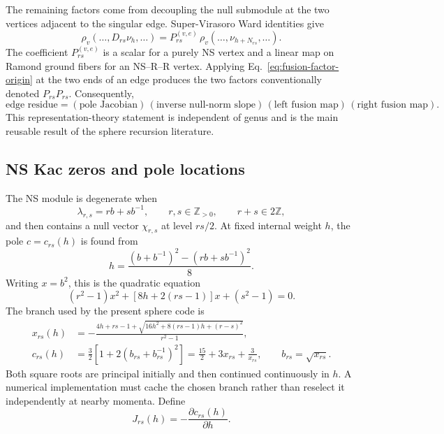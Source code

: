\documentclass[11pt]{article}
\begin{document}
The remaining factors come from decoupling the null submodule at the two
vertices adjacent to the singular edge.  Super-Virasoro Ward identities give
\begin{equation}
 \rho_v(\ldots,D_{rs}\nu_h,\ldots)
 =P^{(v,e)}_{rs}\,
  \rho_v(\ldots,\nu_{h+N_{rs}},\ldots).
 \label{eq:fusion-factor-origin}
\end{equation}
The coefficient $P^{(v,e)}_{rs}$ is a scalar for a purely NS vertex and a
linear map on Ramond ground fibers for an NS--R--R vertex.  Applying
Eq.~\eqref{eq:fusion-factor-origin} at the two ends of an edge produces the
two factors conventionally denoted $P_{rs}P_{rs}$.  Consequently,
\begin{equation}
 \boxed{\text{edge residue}
 =(\text{pole Jacobian})\,
  (\text{inverse null-norm slope})\,
  (\text{left fusion map})\,
  (\text{right fusion map}).}
 \label{eq:jap-meaning}
\end{equation}
This representation-theory statement is independent of genus and is the
main reusable result of the sphere recursion literature.

\subsection{NS Kac zeros and pole locations}

The NS module is degenerate when
\begin{equation}
 \lambda_{r,s}=rb+sb^{-1},
 \qquad r,s\in\mathbb Z_{>0},
 \qquad r+s\in2\mathbb Z,
 \label{eq:lambda-rs}
\end{equation}
and then contains a null vector $\chi_{r,s}$ at level $rs/2$.  At fixed
internal weight $h$, the pole $c=c_{rs}(h)$ is found from
\begin{equation}
 h=\frac{(b+b^{-1})^2-(rb+sb^{-1})^2}{8}.
 \label{eq:pole-equation}
\end{equation}
Writing $x=b^2$, this is the quadratic equation
\begin{equation}
 (r^2-1)x^2+[8h+2(rs-1)]x+(s^2-1)=0.
 \label{eq:b-quadratic}
\end{equation}
The branch used by the present sphere code is
\begin{align}
 x_{rs}(h)
 &=-\frac{4h+rs-1+
 \sqrt{16h^2+8(rs-1)h+(r-s)^2}}{r^2-1},
 \label{eq:b-branch}\\
 c_{rs}(h)
 &=\frac32\left[1+2\left(b_{rs}+b_{rs}^{-1}\right)^2\right]
 =\frac{15}{2}+3x_{rs}+\frac{3}{x_{rs}},
 \qquad b_{rs}=\sqrt{x_{rs}}.
 \label{eq:c-pole}
\end{align}
Both square roots are principal initially and then continued continuously in
$h$.  A numerical implementation must cache the chosen branch rather than
reselect it independently at nearby momenta.  Define
\begin{equation}
 J_{rs}(h)=-\frac{\partial c_{rs}(h)}{\partial h}.
 \label{eq:jacobian}
\end{equation}
\end{document}
